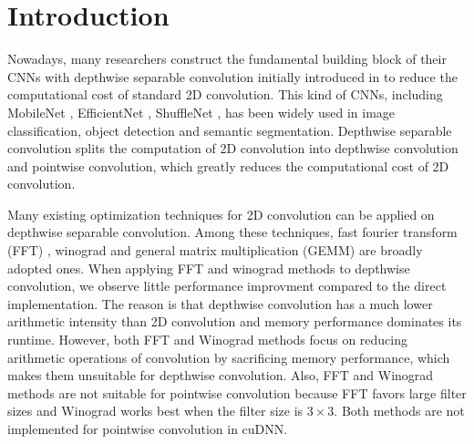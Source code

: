 \section{Introduction}
Nowadays, many researchers construct the fundamental building block of their CNNs with depthwise separable convolution initially introduced in \cite{sifre2014rigid} to reduce the computational cost of standard 2D convolution. 
This kind of CNNs, including MobileNet \cite{Sandler_2018_CVPR,howard2019searching}, EfficientNet \cite{tan2019efficientnet}, ShuffleNet \cite{Ma_2018_ECCV}, has been widely used in image classification, object detection and  semantic segmentation.
Depthwise separable convolution splits the computation of 2D convolution into depthwise convolution and pointwise convolution, which greatly reduces the computational cost of 2D convolution. 

Many existing optimization techniques for 2D convolution can be applied on depthwise separable convolution. 
Among these techniques, fast fourier transform (FFT) \cite{vasilache2014fast}, winograd \cite{lavin2016fast} and general matrix multiplication (GEMM) \cite{Vasudevan2017Parallel,Chellapilla2006High} are broadly adopted ones.
When applying FFT and winograd methods to depthwise convolution, we observe little performance improvment compared to the direct implementation. 
The reason is that depthwise convolution has a much lower arithmetic intensity than 2D convolution and memory performance dominates its runtime. 
However, both FFT and Winograd methods focus on reducing arithmetic operations of convolution by sacrificing memory performance, which makes them unsuitable for depthwise convolution.
Also, FFT and Winograd methods are not suitable for pointwise convolution because FFT favors large filter sizes and Winograd works best when the filter size is $3 \times 3$. Both methods are not implemented for pointwise convolution in cuDNN.

